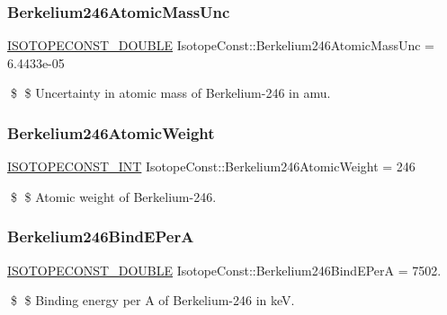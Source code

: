 \subsubsection{\texorpdfstring{Berkelium246\+Atomic\+Mass\+Unc}{Berkelium246AtomicMassUnc}}
{\footnotesize\ttfamily \mbox{\hyperlink{group___isotope_const-_macros_ga8f45a7272ce02c0b4c65c44636ed719a}{I\+S\+O\+T\+O\+P\+E\+C\+O\+N\+S\+T\+\_\+\+D\+O\+U\+B\+LE}} Isotope\+Const\+::\+Berkelium246\+Atomic\+Mass\+Unc = 6.\+4433e-\/05}

\$ \$ Uncertainty in atomic mass of Berkelium-\/246 in amu. \mbox{\label{group___isotope_const-_berkelium-_bk246_gaaec9c79961fe6c6e88e6c942553767a0}} 
\subsubsection{\texorpdfstring{Berkelium246\+Atomic\+Weight}{Berkelium246AtomicWeight}}
{\footnotesize\ttfamily \mbox{\hyperlink{group___isotope_const-_macros_ga5f18360b3e99483a35c32d789e62621c}{I\+S\+O\+T\+O\+P\+E\+C\+O\+N\+S\+T\+\_\+\+I\+NT}} Isotope\+Const\+::\+Berkelium246\+Atomic\+Weight = 246}

\$ \$ Atomic weight of Berkelium-\/246. \mbox{\label{group___isotope_const-_berkelium-_bk246_ga03bef09bbbacf3e70954688f3992c728}} 
\subsubsection{\texorpdfstring{Berkelium246\+Bind\+E\+PerA}{Berkelium246BindEPerA}}
{\footnotesize\ttfamily \mbox{\hyperlink{group___isotope_const-_macros_ga8f45a7272ce02c0b4c65c44636ed719a}{I\+S\+O\+T\+O\+P\+E\+C\+O\+N\+S\+T\+\_\+\+D\+O\+U\+B\+LE}} Isotope\+Const\+::\+Berkelium246\+Bind\+E\+PerA = 7502.}

\$ \$ Binding energy per A of Berkelium-\/246 in keV. \mbox{\label{group___isotope_const-_berkelium-_bk246_ga61946e6f683724c8168f6b04108f9535}} 
